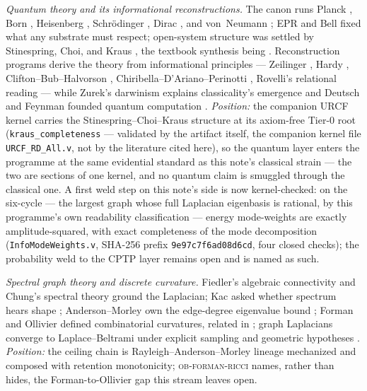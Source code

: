 \documentclass[10pt,twocolumn]{article}
\theoremstyle{definition}
\newcommand{\code}[1]{\texttt{#1}}
\begin{document}
\emph{Quantum theory and its informational reconstructions.} The canon runs
Planck \cite{planck}, Born \cite{born}, Heisenberg \cite{heisenberg1927},
Schr\"odinger \cite{schrodinger1926}, Dirac \cite{diracbook}, and von~Neumann
\cite{vonneumann}; EPR \cite{epr} and Bell \cite{bell} fixed what any substrate
must respect; open-system structure was settled by Stinespring, Choi, and Kraus
\cite{stinespring,choi,kraus}, the textbook synthesis being \cite{nielsenchuang}.
Reconstruction programs derive the theory from informational principles ---
Zeilinger \cite{zeilinger}, Hardy \cite{hardy}, Clifton--Bub--Halvorson
\cite{cbh}, Chiribella--D'Ariano--Perinotti \cite{cdp}, Rovelli's relational
reading \cite{rovellirqm} --- while Zurek's darwinism explains classicality's
emergence \cite{zurek} and Deutsch and Feynman founded quantum computation
\cite{deutsch,feynman1982}. \emph{Position:} the companion URCF kernel carries
the Stinespring--Choi--Kraus structure at its axiom-free Tier-0 root
(\code{kraus\_completeness} --- validated by the artifact itself, the companion
kernel file \code{URCF\_RD\_All.v}, not by the literature cited here), so the
quantum layer enters the programme at the
same evidential standard as this note's classical strain --- the two are sections
of one kernel, and no quantum claim is smuggled through the classical one. A first weld step on this note's side is now kernel-checked: on the
six-cycle --- the largest graph whose full Laplacian eigenbasis is rational, by
this programme's own readability classification --- energy mode-weights are
exactly amplitude-squared, with exact completeness of the mode decomposition
(\code{InfoModeWeights.v}, SHA-256 prefix \code{9e97c7f6ad08d6cd}, four closed
checks); the probability weld to the CPTP layer remains open and is named as
such.

\emph{Spectral graph theory and discrete curvature.} Fiedler's algebraic
connectivity \cite{fiedler} and Chung's spectral theory \cite{chung} ground the
Laplacian; Kac asked whether spectrum hears shape \cite{kac};
Anderson--Morley own the edge-degree eigenvalue bound \cite{andersonmorley};
Forman \cite{forman} and Ollivier \cite{ollivier} defined combinatorial
curvatures, related in \cite{linluyau}; graph Laplacians converge to Laplace--Beltrami under explicit sampling and
geometric hypotheses \cite{belkinniyogi,bik}. \emph{Position:} the ceiling chain is
Rayleigh--Anderson--Morley lineage mechanized and composed with retention
monotonicity; \textsc{ob-forman-ricci} names, rather than hides, the
Forman-to-Ollivier gap this stream leaves open.
\end{document}
